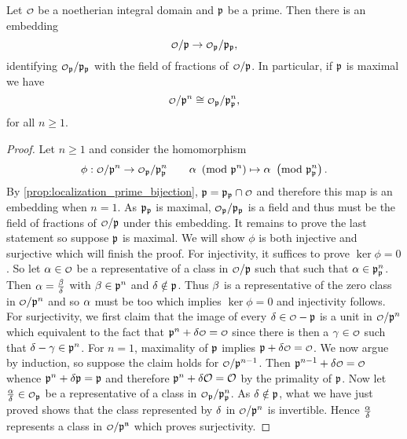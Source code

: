     \begin{proposition}\label{prop:localization_at_prime_is_local}
      Let $\smc{O}$ be a noetherian integral domain and $\mathfrak{p}$ be a prime. Then there is an embedding
      \[
        \smc{O}/\mf{p} \to \smc{O}_{\mf{p}}/\mf{p}_{\mf{p}},
      \]
      identifying $\smc{O}_{\mf{p}}/\mf{p}_{\mf{p}}$ with the field of fractions of $\smc{O}/\mf{p}$. In particular, if $\mathfrak{p}$ is maximal we have
      \[
        \smc{O}/\mf{p}^{n} \cong \smc{O}_{\mf{p}}/\mf{p}_{\mf{p}}^{n},
      \]
      for all $n \ge 1$.
    \end{proposition}
    \begin{proof}
      Let $n \ge 1$ and consider the homomorphism
      \[
        \phi:\smc{O}/\mf{p}^{n} \to \smc{O}_{\mf{p}}/\mf{p}_{\mf{p}}^{n} \qquad \a \tmod{\mf{p}^{n}} \mapsto \a \tmod{\mf{p}_{\mf{p}}^{n}}.
      \]
      By \cref{prop:localization_prime_bijection}, $\mf{p} = \mf{p}_{\mf{p}} \cap \smc{O}$ and therefore this map is an embedding when $n = 1$. As $\mathfrak{p}_{\mathfrak{p}}$ is maximal, $\smc{O}_{\mf{p}}/\mf{p}_{\mf{p}}$ is a field and thus must be the field of fractions of $\smc{O}/\mf{p}$ under this embedding. It remains to prove the last statement so suppose $\mathfrak{p}$ is maximal. We will show $\phi$ is both injective and surjective which will finish the proof. For injectivity, it suffices to prove $\ker\phi = 0$. So let $\a \in \smc{O}$ be a representative of a class in $\smc{O}/\mf{p}$ such that such that $\alpha \in \mathfrak{p}_{\mathfrak{p}}^{n}$. Then $\alpha = \frac{\beta}{\delta}$ with $\beta \in \mathfrak{p}^{n}$ and $\delta \notin \mathfrak{p}$. Thus $\beta$ is a representative of the zero class in $\smc{O}/\mf{p}^{n}$ and so $\alpha$ must be too which implies $\ker\phi = 0$ and injectivity follows. For surjectivity, we first claim that the image of every $\d \in \smc{O}-\mf{p}$ is a unit in $\smc{O}/\mf{p}^{n}$ which equivalent to the fact that $\mf{p}^{n}+\d\smc{O} = \smc{O}$ since there is then a $\g \in \smc{O}$ such that $\delta-\gamma \in \mathfrak{p}^{n}$. For $n = 1$, maximality of $\mathfrak{p}$ implies $\mf{p}+\d\smc{O} = \smc{O}$. We now argue by induction, so suppose the claim holds for $\smc{O}/\mf{p}^{n-1}$. Then $\mf{p}^{n-1}+\d\smc{O} = \smc{O}$ whence $\mathfrak{p}^{n}+\delta\mathfrak{p} = \mathfrak{p}$ and therefore $\mathfrak{p}^{n}+\delta\mathcal{O} = \mathcal{O}$ by the primality of $\mathfrak{p}$. Now let $\frac{\a}{\d} \in \smc{O}_{\mf{p}}$ be a representative of a class in $\smc{O}_{\mf{p}}/\mf{p}_{\mf{p}}^{n}$. As $\delta \notin \mathfrak{p}$, what we have just proved shows that the class represented by $\delta$ in $\smc{O}/\mf{p}^{n}$ is invertible. Hence $\frac{\alpha}{\delta}$ represents a class in $\smc{O}/\mf{p^{n}}$ which proves surjectivity.
    \end{proof}
    
